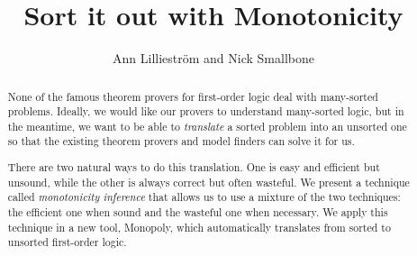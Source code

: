 \documentclass{llncs}
\title{Sort it out with Monotonicity}
\author{Ann Lilliestr\"om and Nick Smallbone}
\institute{ Chalmers University of Technology, Gothenburg, Sweden
         \\ \email{\{annl,nicsma\}@chalmers.se}
          }
\begin{document}
\maketitle

\begin{abstract}
None of the famous theorem provers for first-order logic deal with
many-sorted problems. Ideally, we would like our provers to understand
many-sorted logic, but in the meantime, we want to be able to
\emph{translate} a sorted problem into an unsorted one so that the
existing theorem provers and model finders can solve it for us.

There are two natural ways to do this translation. One is easy and efficient
but unsound, while the other is always correct but often wasteful. 
We present a technique called
\emph{monotonicity inference} that allows us to use a mixture of the
two techniques: the efficient one when sound and the wasteful one when
necessary. We apply this technique in a new tool, Monopoly, which
automatically translates from sorted to unsorted first-order logic.
\end{abstract}







 
\end{document}
